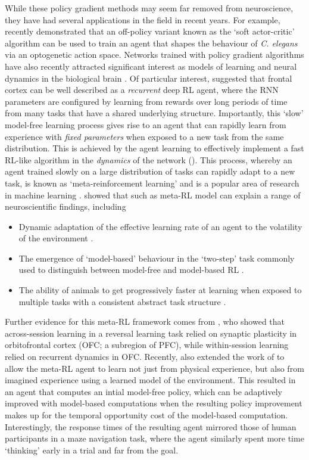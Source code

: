 While these policy gradient methods may seem far removed from neuroscience, they have had several applications in the field in recent years.
For example, \citet{li2022integrating} recently demonstrated that an off-policy variant known as the `soft actor-critic' algorithm \citep{haarnoja2018soft} can be used to train an agent that shapes the behaviour of \textit{C. elegans} via an optogenetic action space.
Networks trained with policy gradient algorithms have also recently attracted significant interest as models of learning and neural dynamics in the biological brain \citep{wang2018prefrontal, jensen2023recurrent, merel2019deep}.
Of particular interest, \citet{wang2018prefrontal} suggested that frontal cortex can be well described as a \emph{recurrent} deep RL agent, where the RNN parameters are configured by learning from rewards over long periods of time from many tasks that have a shared underlying structure.
Importantly, this `slow' model-free learning process gives rise to an agent that can rapidly learn from experience with \emph{fixed parameters} when exposed to a new task from the same distribution.
This is achieved by the agent learning to effectively implement a fast RL-like algorithm in the \emph{dynamics} of the network ().
This process, whereby an agent trained slowly on a large distribution of tasks can rapidly adapt to a new task, is known as `meta-reinforcement learning' and is a popular area of research in machine learning \citep{finn2017model, ritter2018been, duan2016rl, wang2016learning}.
\citet{wang2018prefrontal} showed that such as meta-RL model can explain a range of neuroscientific findings, including
\begin{itemize}
    \item Dynamic adaptation of the effective learning rate of an agent to the volatility of the environment \citep{behrens2007learning}.
    \item The emergence of `model-based' behaviour in the `two-step' task commonly used to distinguish between model-free and model-based RL \citep{miller2017dorsal,daw2011model}.
    \item The ability of animals to get progressively faster at learning when exposed to multiple tasks with a consistent abstract task structure \citep{harlow1949formation}.
\end{itemize}
Further evidence for this meta-RL framework comes from \citet{hattori2023meta}, who showed that across-session learning in a reversal learning task relied on synaptic plasticity in orbitofrontal cortex (OFC; a subregion of PFC), while within-session learning relied on recurrent dynamics in OFC.
Recently, \citet{jensen2023recurrent} also extended the work of \citet{wang2018prefrontal} to allow the meta-RL agent to learn not just from physical experience, but also from imagined experience using a learned model of the environment.
This resulted in an agent that computes an intial model-free policy, which can be adaptively improved with model-based computations when the resulting policy improvement makes up for the temporal opportunity cost of the model-based computation.
Interestingly, the response times of the resulting agent mirrored those of human participants in a maze navigation task, where the agent similarly spent more time `thinking' early in a trial and far from the goal.
